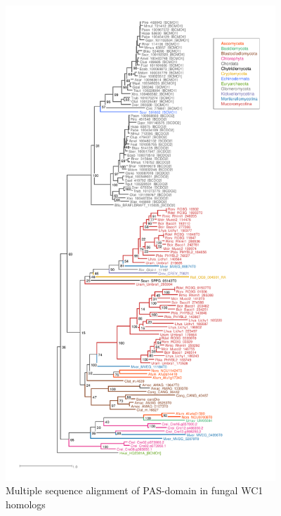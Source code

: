 \begin{figure}[tbp]
  \includegraphics[width=4in]{./Chapter_Coelomomyces/img/BCMO1DO2.png}
  \caption[PAS alignment of WC1 homologs]{Multiple sequence alignment of PAS-domain in fungal WC1 homologs}
  \label{fig:ChClat_PASaln}
\end{figure}
